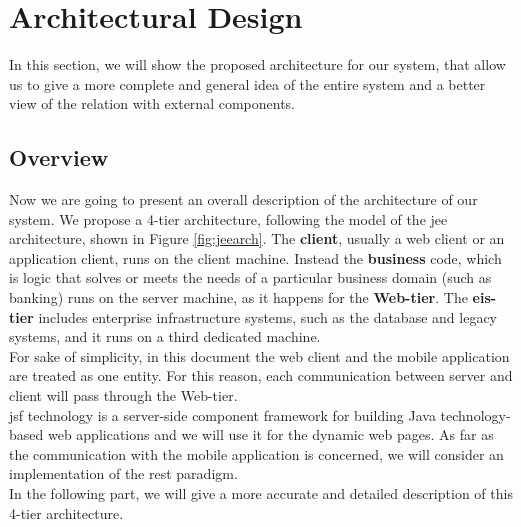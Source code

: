 \section{Architectural Design} \label{sec:arch-design}

In this section, we will show the proposed architecture for our system, that allow us to give a more complete and general idea of the entire system and a better view of the relation with external components.

\subsection{Overview} \label{subsec:overview}
Now we are going to present an overall description of the architecture of our system. We propose a 4-tier architecture, following the model of the \acl{jee} architecture, shown in Figure \ref{fig:jeearch}. The \textbf{client}, usually a web client or an application client, runs on the client machine. Instead the \textbf{business} code, which is logic that solves or meets the needs of a particular business domain (such as banking) runs on the server machine, as it happens for the \textbf{Web-tier}. The \textbf{\acl{eis}-tier} includes enterprise infrastructure systems, such as the database and legacy systems, and it runs on a third dedicated machine. \\For sake of simplicity, in this document the web client and the mobile application are treated as one entity. For this reason, each communication between server and client will pass through the Web-tier.
\\ \acs{jsf} technology is a server-side component framework for building Java technology-based web applications and we will use it for the dynamic web pages.
As far as the communication with the mobile application is concerned, we will consider an implementation of the \acs{rest} paradigm.\\
\newline
In the following part, we will give a more accurate and detailed description of this 4-tier architecture.

